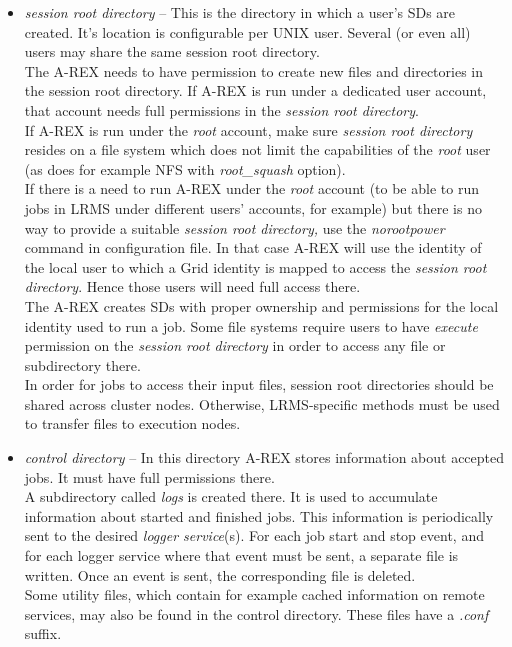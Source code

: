 \documentclass{article}                            %
\begin{document}
\begin{itemize}
\item \textit{session root directory} -- This is the directory in which a
user's SDs are created. It's location is configurable per UNIX user.
Several (or even all) users may share the same session root directory.\\
The A-REX needs to have permission to create new files and directories
in the session root directory. If A-REX is run under a dedicated user
account, that account needs full permissions in the \textit{session
root directory}.\\
If A-REX is run under the \emph{root} account, make sure \textit{session
root directory} resides on a file system which does not limit the
capabilities of the \emph{root} user (as does for example NFS with
\emph{root\_squash} option).\\
If there is a need to run A-REX under the \emph{root} account (to
be able to run jobs in LRMS under different users' accounts, for example)
but there is no way to provide a suitable \textit{session root directory,}
use the \emph{norootpower} command in configuration file. In that
case A-REX will use the identity of the local user to which a Grid
identity is mapped to access the \textit{session root directory}.
Hence those users will need full access there.\\
The A-REX creates SDs with proper ownership and permissions for the
local identity used to run a job. Some file systems require users
to have \emph{execute} permission on the \textit{session root directory}
in order to access any file or subdirectory there.\\
In order for jobs to access their input files, session root directories
should be shared across cluster nodes. Otherwise, LRMS-specific methods
must be used to transfer files to execution nodes. 
\end{itemize}

\begin{itemize}
\item \textit{control directory} -- In this directory A-REX stores information
about accepted jobs. It must have full permissions there.\\
A subdirectory called \textit{logs} is created there. It is used to
accumulate information about started and finished jobs. This information
is periodically sent to the desired \emph{logger service}(s). For
each job start and stop event, and for each logger service where that
event must be sent, a separate file is written. Once an event is sent,
the corresponding file is deleted.\\
Some utility files, which contain for example cached information on remote
services, may also be found in the control directory. These files have
a \textit{.conf} suffix.
\end{itemize}
\end{document}
